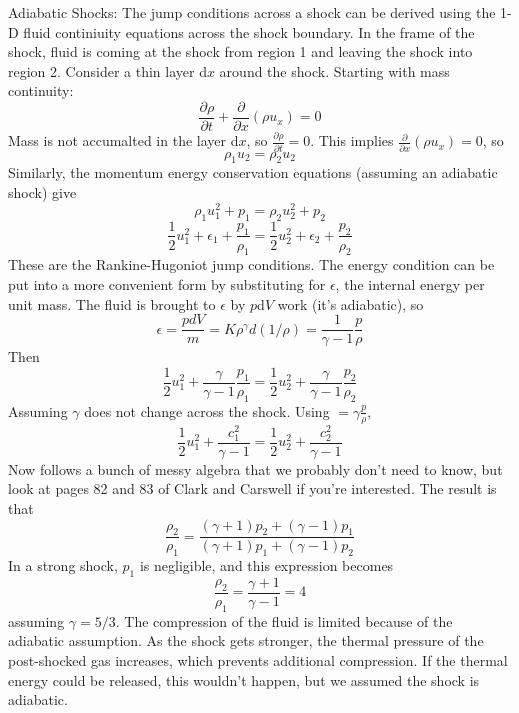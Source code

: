 Adiabatic Shocks:\newline
The jump conditions across a shock can be derived using the 1-D fluid 
continiuity equations across the shock boundary.  In the frame of the shock, 
fluid is coming at the shock from region 1 and leaving the shock into region 2.  
Consider a thin layer d$x$ around the shock.  Starting with mass continuity:
\begin{equation}
\frac{\partial \rho}{\partial t}+\frac{\partial}{\partial x}(\rho u_x)=0
\end{equation}
Mass is not accumalted in the layer d$x$, so 
$\frac{\partial \rho}{\partial t}=0$.  This implies 
$\frac{\partial}{\partial x}(\rho u_x)=0$, so 
\begin{equation}
\boxed{\rho_1u_2=\rho_2u_2}
\end{equation}
Similarly, the momentum energy conservation equations (assuming an adiabatic 
shock) give 
\begin{equation}
\boxed{\rho_1u_1^2+p_1=\rho_2u_2^2+p_2}
\end{equation}
\begin{equation}
\boxed{\frac{1}{2}u_1^2+\epsilon_1+\frac{p_1}{\rho_1}=\frac{1}{2}u_2^2+\epsilon_2+\frac{p_2}{\rho_2}}
\end{equation}
These are the Rankine-Hugoniot jump conditions.  The energy condition can 
be put into a more convenient form by substituting for $\epsilon$, the internal 
energy per unit mass.  The fluid is brought to $\epsilon$ by $p$d$V$ work (it's 
adiabatic), so
\begin{equation}
\epsilon=\frac{pdV}{m}=K\rho^{\gamma}d(1/\rho)=\frac{1}{\gamma-1}\frac{p}{\rho}
\end{equation}
Then
\begin{equation}
\frac{1}{2}u_1^2+\frac{\gamma}{\gamma-1}\frac{p_1}{\rho_1}=\frac{1}{2}u_2^2+\frac{\gamma}{\gamma-1}\frac{p_2}{\rho_2}
\end{equation}
Assuming $\gamma$ does not change across the shock.  Using 
$=\gamma\frac{p}{\rho}$,
\begin{equation}
\frac{1}{2}u_1^2+\frac{c_1^2}{\gamma-1}=\frac{1}{2}u_2^2+\frac{c_2^2}{\gamma-1}
\end{equation}
Now follows a bunch of messy algebra that we probably don't need to know, but 
look at pages 82 and 83 of Clark and Carswell if you're interested.  
The result is that 
\begin{equation}
\frac{\rho_2}{\rho_1}=\frac{(\gamma+1)p_2+(\gamma-1)p_1}{(\gamma+1)p_1+(\gamma-1)p_2}
\end{equation}
In a strong shock, $p_1$ is negligible, and this expression becomes
\begin{equation}\label{eq:den}
\boxed{\frac{\rho_2}{\rho_1}=\frac{\gamma+1}{\gamma-1}=4}
\end{equation}
assuming $\gamma=5/3$.  The compression of the fluid is limited because of 
the adiabatic assumption.  As the shock gets stronger, the thermal pressure 
of the post-shocked gas increases, which prevents additional compression.  
If the thermal energy could be released, this wouldn't happen, but we assumed 
the shock is adiabatic.  

